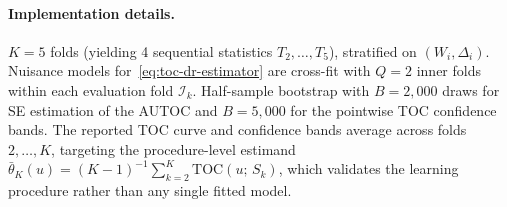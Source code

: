 \documentclass{article}
\begin{document}
\paragraph{Implementation details.}
$K = 5$ folds (yielding 4 sequential statistics $T_2, \ldots, T_5$), stratified on $(W_i, \Delta_i)$. Nuisance models for~\eqref{eq:toc-dr-estimator} are cross-fit with $Q = 2$ inner folds within each evaluation fold $\mathcal{I}_k$. Half-sample bootstrap with $B = 2{,}000$ draws for SE estimation of the AUTOC and $B = 5{,}000$ for the pointwise TOC confidence bands. The reported TOC curve and confidence bands average across folds $2, \ldots, K$, targeting the procedure-level estimand $\bar\theta_K(u) = (K{-}1)^{-1}\sum_{k=2}^K \mathrm{TOC}(u;\, S_k)$, which validates the learning procedure rather than any single fitted model.
\end{document}
